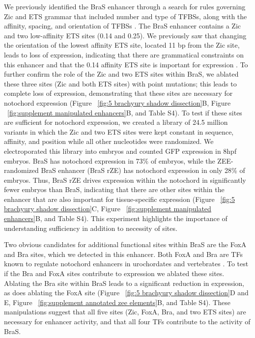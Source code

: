 We previously identified the BraS enhancer through a search for rules governing Zic and ETS grammar that included number and type of TFBSs, along with the affinity, spacing, and orientation of TFBSs \cite{farley2016}. The BraS enhancer contains a Zic and two low-affinity ETS sites (0.14 and 0.25). We previously saw that changing the orientation of the lowest affinity ETS site, located 11 bp from the Zic site, leads to loss of expression, indicating that there are grammatical constraints on this enhancer and that the 0.14 affinity ETS site is important for expression \cite{farley2016}. To further confirm the role of the Zic and two ETS sites within BraS, we ablated these three sites (Zic and both ETS sites) with point mutations; this leads to complete loss of expression, demonstrating that these sites are necessary for notochord expression (Figure ~\ref{fig:5 brachyury shadow dissection}B, Figure ~\ref{fig:supplement manipulated enhancers}B, and Table S4). To test if these sites are sufficient for notochord expression, we created a library of 24.5 million variants in which  the Zic and two ETS sites were kept constant in sequence, affinity, and position while all other nucleotides were randomized. We electroporated this library into embryos and counted GFP expression in 8hpf embryos. BraS has notochord expression in 73\% of embryos, while the ZEE-randomized BraS enhancer (BraS rZE) has notochord expression in only 28\% of embryos. Thus, BraS rZE drives expression within the notochord in significantly fewer embryos than BraS, indicating that there are other sites within the enhancer that are also important for tissue-specific expression (Figure ~\ref{fig:5 brachyury shadow dissection}C, Figure ~\ref{fig:supplement manipulated enhancers}B, and Table S4). This experiment highlights the importance of understanding sufficiency in addition to necessity of sites.

Two obvious candidates for additional functional sites within BraS are the FoxA and Bra sites, which we detected in this enhancer. Both FoxA and Bra are TFs known to regulate notochord enhancers in urochordates and vertebrates \cite{ikeda2016,jose-edwards2015a,kumano2006,lolas2014,passamaneck2009a,reeves2021}. To test if the Bra and FoxA sites contribute to expression we ablated these sites. Ablating the Bra site within BraS leads to a significant reduction in expression, as does ablating the FoxA site (Figure ~\ref{fig:5 brachyury shadow dissection}D and E, Figure ~\ref{fig:supplement annotated zee elements}B, and Table S4). These manipulations suggest that all five sites (Zic, FoxA, Bra, and two ETS sites) are necessary for enhancer activity, and that all four TFs contribute to the activity of BraS.  

